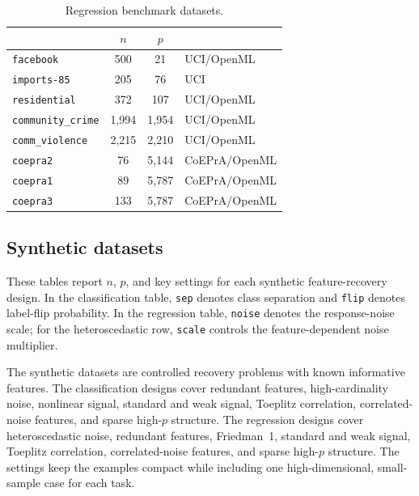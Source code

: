 \begin{table}[H]
  \centering
  \scriptsize
  \setlength{\tabcolsep}{5pt}
  \begin{tabular}{@{}lS[table-format=4.0]S[table-format=4.0]l@{}}
    \toprule
     & {$n$} & {$p$} &  \\
    \midrule
    \nolinkurl{facebook} & 500 & 21 & UCI/OpenML \\
    \nolinkurl{imports-85} & 205 & 76 & UCI \\
    \nolinkurl{residential} & 372 & 107 & UCI/OpenML \\
    \nolinkurl{community_crime} & 1,994 & 1,954 & UCI/OpenML \\
    \nolinkurl{comm_violence} & 2,215 & 2,210 & UCI/OpenML \\
    \nolinkurl{coepra2} & 76 & 5,144 & CoEPrA/OpenML \\
    \nolinkurl{coepra1} & 89 & 5,787 & CoEPrA/OpenML \\
    \nolinkurl{coepra3} & 133 & 5,787 & CoEPrA/OpenML \\
    \bottomrule
  \end{tabular}
  \caption{Regression benchmark datasets.}
  \label{tab:benchmark-dataset-inventory-reg}
\end{table}

\FloatBarrier

\subsection{Synthetic datasets}

These tables report $n$, $p$, and key settings for each
synthetic feature-recovery design. In the classification table, \texttt{sep}
denotes class separation and \texttt{flip} denotes label-flip probability. In
the regression table, \texttt{noise} denotes the response-noise scale; for the
heteroscedastic row, \texttt{scale} controls the feature-dependent noise
multiplier.

The synthetic datasets are controlled recovery problems with known informative
features. The classification designs cover redundant features,
high-cardinality noise, nonlinear signal, standard and weak signal, Toeplitz
correlation, correlated-noise features, and sparse high-$p$ structure. The
regression designs cover heteroscedastic noise, redundant features, Friedman~1,
standard and weak signal, Toeplitz correlation, correlated-noise features, and
sparse high-$p$ structure. The settings keep the examples compact while
including one high-dimensional, small-sample case for each task.


